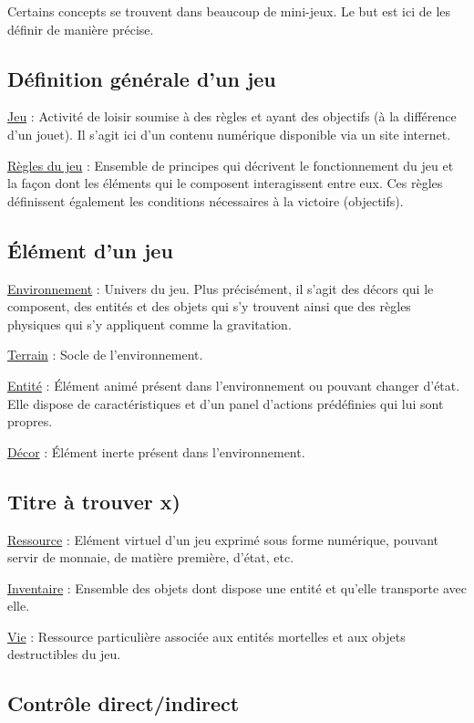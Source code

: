 Certains concepts se trouvent dans beaucoup de mini-jeux. Le but est ici de les définir de manière précise.

\subsection*{Définition générale d'un jeu}

\underline{Jeu} : 
Activité de loisir soumise à des règles et ayant des objectifs (à la différence d'un jouet). Il s'agit ici d'un contenu numérique
 disponible via un site internet.

\underline{Règles du jeu} : 
Ensemble de principes qui décrivent le fonctionnement du jeu et 
la façon dont les éléments qui le composent interagissent entre eux. 
Ces règles définissent également les conditions nécessaires à la victoire (objectifs).

\subsection*{Élément d'un jeu}

\underline{Environnement} : 
Univers du jeu. 
Plus précisément, il s'agit des décors qui le composent, des entités et des objets qui s'y trouvent ainsi que 
des règles physiques qui s'y appliquent comme la gravitation.

\underline{Terrain} : 
Socle de l'environnement.

\underline{Entité} : 
Élément animé présent dans l'environnement ou pouvant changer d'état. 
Elle dispose de caractéristiques et d'un panel d'actions prédéfinies qui lui sont propres.

\underline{Décor} : 
Élément inerte présent dans l'environnement.


\subsection*{Titre à trouver x)}

\underline{Ressource} : 
Elément virtuel d'un jeu exprimé sous forme numérique, pouvant servir de monnaie, de matière première, d'état, etc.

\underline{Inventaire} : 
Ensemble des objets dont dispose une entité et qu'elle transporte avec elle.

\underline{Vie} : 
Ressource particulière associée aux entités mortelles et aux objets destructibles du jeu.


\subsection*{Contrôle direct/indirect}

